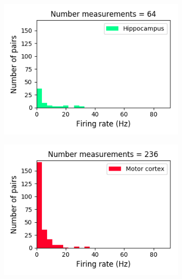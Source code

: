 \documentclass[a4paper,12pt]{article}
\theoremstyle{definition}
\begin{document}
\begin{figure}[p]
  \begin{subfigure}{0.5\textwidth}
    \centering
    \includegraphics[width=\textwidth]{figures/all_hippocampus_8_1p0_firing_rate_histogram.png}
  \end{subfigure}
  \begin{subfigure}{0.5\textwidth}
    \centering
    \includegraphics[width=\textwidth]{figures/all_motor_cortex_8_1p0_firing_rate_histogram.png}
  \end{subfigure}
  \begin{subfigure}{0.5\textwidth}
    \centering

\end{subfigure}
\end{figure}
\end{document}
